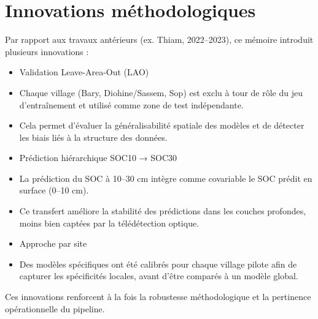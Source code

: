 \documentclass[12pt,a4paper,oneside]{report}
\begin{document}
\section{Innovations méthodologiques}
Par rapport aux travaux antérieurs (ex. Thiam, 2022–2023), ce mémoire introduit plusieurs innovations :
\begin{itemize}
  \item Validation Leave-Area-Out (LAO)

\item Chaque village (Bary, Diohine/Sassem, Sop) est exclu à tour de rôle du jeu d’entraînement et utilisé comme zone de test indépendante.

\item Cela permet d’évaluer la généralisabilité spatiale des modèles et de détecter les biais liés à la structure des données.

\item Prédiction hiérarchique SOC10 → SOC30

\item La prédiction du SOC à 10–30 cm intègre comme covariable le SOC prédit en surface (0–10 cm).

\item Ce transfert améliore la stabilité des prédictions dans les couches profondes, moins bien captées par la télédétection optique.

\item Approche par site

\item Des modèles spécifiques ont été calibrés pour chaque village pilote afin de capturer les spécificités locales, avant d’être comparés à un modèle global.
\end{itemize}
Ces innovations renforcent à la fois la robustesse méthodologique et la pertinence opérationnelle du pipeline.
\end{document}
